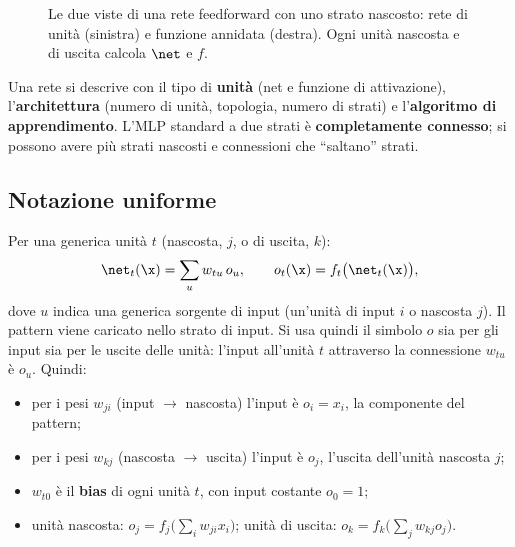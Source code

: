\begin{figure}[ht]
\centering
{}
\caption{Le due viste di una rete feedforward con uno strato nascosto: rete di unità (sinistra) e funzione
annidata (destra). Ogni unità nascosta e di uscita calcola $\net$ e $f$.}
\label{fig:due-viste}
\end{figure}

Una rete si descrive con il tipo di \textbf{unità} (net e funzione di attivazione), l'\textbf{architettura}
(numero di unità, topologia, numero di strati) e l'\textbf{algoritmo di apprendimento}. L'MLP standard a due
strati è \textbf{completamente connesso}; si possono avere più strati nascosti e connessioni che ``saltano''
strati.

\subsection{Notazione uniforme}

Per una generica unità $t$ (nascosta, $j$, o di uscita, $k$):
\begin{equation}\label{eq:notazione-t}
\net_t(\x) = \sum_u w_{tu}\,o_u, \qquad o_t(\x) = f_t\big(\net_t(\x)\big),
\end{equation}
dove $u$ indica una generica sorgente di input (un'unità di input $i$ o nascosta $j$). Il pattern viene caricato
nello strato di input. Si usa quindi il simbolo $o$ sia per gli input sia per le uscite delle unità: l'input
all'unità $t$ attraverso la connessione $w_{tu}$ è $o_u$. Quindi:
\begin{itemize}
  \item per i pesi $w_{ji}$ (input $\to$ nascosta) l'input è $o_i = x_i$, la componente del pattern;
  \item per i pesi $w_{kj}$ (nascosta $\to$ uscita) l'input è $o_j$, l'uscita dell'unità nascosta $j$;
  \item $w_{t0}$ è il \textbf{bias} di ogni unità $t$, con input costante $o_0=1$;
  \item unità nascosta: $o_j = f_j\big(\sum_iw_{ji}x_i\big)$; unità di uscita: $o_k = f_k\big(\sum_jw_{kj}o_j\big)$.
\end{itemize}

